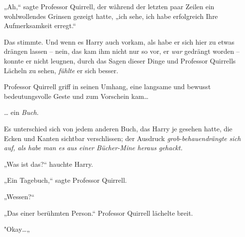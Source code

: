 „Ah,“ sagte Professor Quirrell, der während der letzten paar Zeilen ein wohlwollendes Grinsen gezeigt hatte, „ich sehe, ich habe erfolgreich Ihre Aufmerksamkeit erregt.“

Das stimmte. Und wenn es Harry auch vorkam, als habe er sich hier zu etwas drängen lassen -- nein, das kam ihm nicht nur so vor, er \emph{war} gedrängt worden -- konnte er nicht leugnen, durch das Sagen dieser Dinge und Professor Quirrells Lächeln zu sehen, \emph{fühlte} er sich besser.

Professor Quirrell griff in seinen Umhang, eine langsame und bewusst bedeutungsvolle Geste und zum Vorschein kam…

… ein \emph{Buch.}

Es unterschied sich von jedem anderen Buch, das Harry je gesehen hatte, die Ecken und Kanten sichtbar verschlissen; der Ausdruck \emph{grob-behauendrängte sich auf, als habe man es aus einer Bücher-Mine heraus gehackt.}

„Was ist das?“ hauchte Harry.

„Ein Tagebuch,“ sagte Professor Quirrell.

„Wessen?“

„Das einer berühmten Person.“ Professor Quirrell lächelte breit.

"Okay…„

